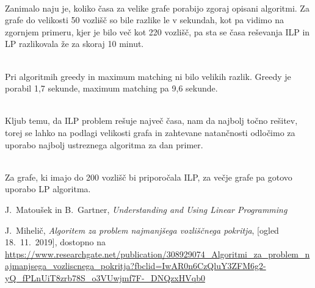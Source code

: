 \documentclass[12pt,a4paper]{amsart}
\theoremstyle{definition} %
\theoremstyle{plain} %
\begin{document}
 \hspace*{\fill} %
\\ 
Zanimalo naju je, koliko časa za velike grafe porabijo zgoraj opisani algoritmi. Za grafe do velikosti 50 vozlišč so bile razlike le v sekundah, kot pa vidimo na zgornjem primeru, kjer je bilo več kot 220 vozlišč, pa sta se časa reševanja ILP in LP razlikovala že za skoraj 10 minut. 

 \hspace*{\fill} %
\\ 
Pri algoritmih greedy in maximum matching ni bilo velikih razlik. Greedy je porabil 1,7 sekunde, maximum matching pa 9,6 sekunde. 

 \hspace*{\fill} %
\\ 
Kljub temu, da ILP problem rešuje največ časa, nam da najbolj točno rešitev, torej se lahko na podlagi velikosti grafa in zahtevane natančnosti odločimo za uporabo najbolj ustreznega algoritma za dan primer.

 \hspace*{\fill} %
\\ 
Za grafe, ki imajo do 200 vozlišč bi priporočala ILP, za večje grafe pa gotovo uporabo LP algoritma. 



\newpage
\begin{thebibliography}{}


J.~Matoušek in B.~Gartner, \emph{Understanding and Using Linear Programming}


 J.~Mihelič, \emph{Algoritem za problem najmanjšega vozliščnega pokritja}, [ogled 18.~11.~2019], dostopno na \url{https://www.researchgate.net/publication/308929074_Algoritmi_za_problem_najmanjsega_vozliscnega_pokritja?fbclid=IwAR0n6CzQluY3ZFM6g2-yQ_fPLnUiT8zrb78S_o3VUwjmf7F-_DNQzxHVqb0}




\end{thebibliography}{}
\end{document}
